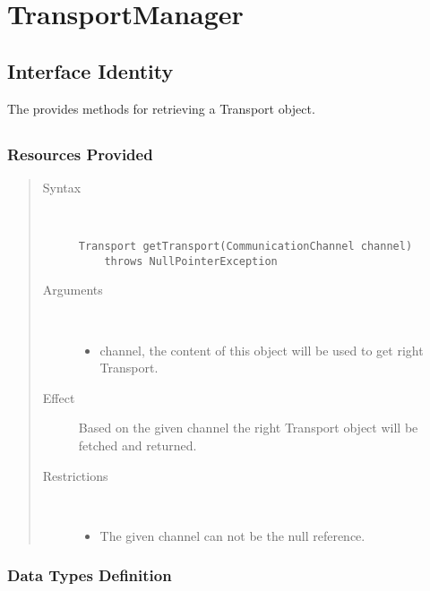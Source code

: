 \section{TransportManager}
\label{api:notification-unit-transport-manager}

\subsection{Interface Identity}

\npar The  provides methods for retrieving a
Transport object.

\subsection{}

\subsubsection{Resources Provided}

\begin{quote}
	\begin{description}
		\item[Syntax] \
		\begin{verbatim}
Transport getTransport(CommunicationChannel channel)
    throws NullPointerException
		\end{verbatim}
		\item[Arguments] \
		\begin{itemize}
		  \item channel, the content of this object will be used to get right
		  Transport.
		\end{itemize}
		\item[Effect] Based on the given channel the right Transport object will be
		fetched and returned. 
		\item[Restrictions] \
		\begin{itemize}
		  \item The given channel can not be the null reference. 
		\end{itemize}
	\end{description} 
\end{quote}

\subsubsection{Data Types Definition}

